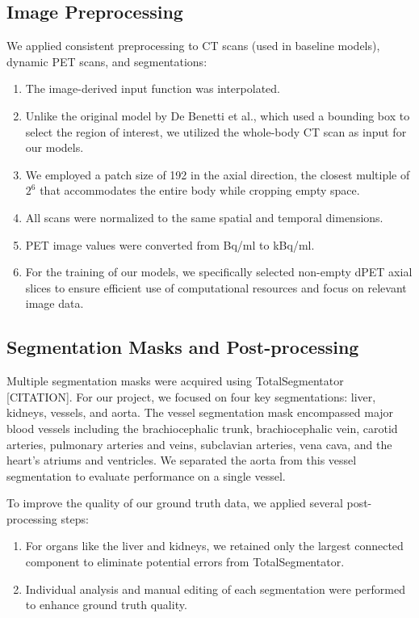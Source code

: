 \subsection{Image Preprocessing}
We applied consistent preprocessing to CT scans (used in baseline models), dynamic PET scans, and segmentations:
\begin{enumerate}
    \item The image-derived input function was interpolated.
    \item Unlike the original model by De Benetti et al., which used a bounding box to select the region of interest, we utilized the whole-body CT scan as input for our models.
    \item We employed a patch size of 192 in the axial direction, the closest multiple of $2^6$ that accommodates the entire body while cropping empty space.
    \item All scans were normalized to the same spatial and temporal dimensions.
    \item PET image values were converted from Bq/ml to kBq/ml.
    \item For the training of our models, we specifically selected non-empty dPET axial slices to ensure efficient use of computational resources and focus on relevant image data.
\end{enumerate}

\subsection{Segmentation Masks and Post-processing}
Multiple segmentation masks were acquired using TotalSegmentator [CITATION]. For our project, we focused on four key segmentations: liver, kidneys, vessels, and aorta. The vessel segmentation mask encompassed major blood vessels including the brachiocephalic trunk, brachiocephalic vein, carotid arteries, pulmonary arteries and veins, subclavian arteries, vena cava, and the heart's atriums and ventricles. We separated the aorta from this vessel segmentation to evaluate performance on a single vessel.

To improve the quality of our ground truth data, we applied several post-processing steps:

\begin{enumerate}
    \item For organs like the liver and kidneys, we retained only the largest connected component to eliminate potential errors from TotalSegmentator.
    \item Individual analysis and manual editing of each segmentation were performed to enhance ground truth quality.
\end{enumerate}


